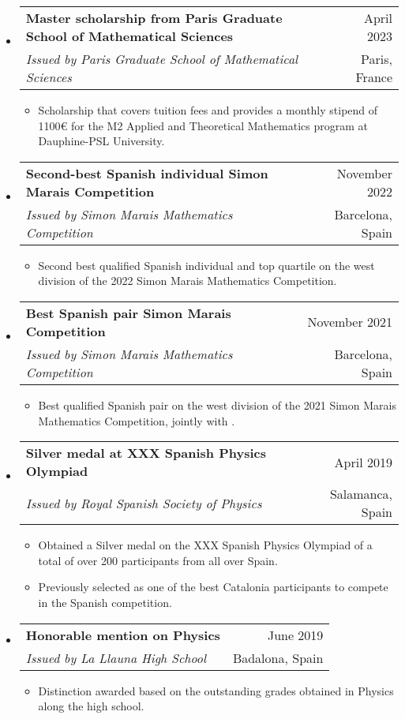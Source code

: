 \documentclass[a4paper,11pt]{article}
\makeatletter
\newcommand{\resumeQuadHeading}[4]{
  \item
  \begin{tabular*}{0.96\textwidth}[t]{l@{\extracolsep{\fill}}r}
    \textbf{#1} & \small #2 \\
    \small#3 & \small #4 \\
  \end{tabular*}
}
\newcommand{\resumeHeadingListStart}{
  \begin{itemize}[leftmargin=0.15in, label={}]
}
\newcommand{\resumeHeadingListEnd}{\end{itemize}}
\makeatother
\begin{document}
\resumeHeadingListStart{}
\resumeQuadHeading{Master scholarship from Paris Graduate School of Mathematical Sciences}{April 2023}{\textit{Issued by Paris Graduate School of Mathematical Sciences}}{Paris, France}
\begin{itemize}[leftmargin=3em, itemsep=0.1em, topsep=2pt]
  \item \small Scholarship that covers tuition fees and provides a monthly stipend of 1100€ for the M2 Applied and Theoretical Mathematics program at Dauphine-PSL University.
\end{itemize}
\resumeHeadingListEnd{}

\resumeHeadingListStart{}
\resumeQuadHeading{Second-best Spanish individual Simon Marais Competition}{November 2022}{\textit{Issued by Simon Marais Mathematics Competition}}{Barcelona, Spain}
\begin{itemize}[leftmargin=3em, itemsep=0.1em, topsep=2pt]
  \item \small Second best qualified Spanish individual and top quartile on the west division of the 2022 Simon Marais Mathematics Competition.
\end{itemize}
\resumeHeadingListEnd{}

\resumeHeadingListStart{}
\resumeQuadHeading{Best Spanish pair Simon Marais Competition}{November 2021}{\textit{Issued by Simon Marais Mathematics Competition}}{Barcelona, Spain}
\begin{itemize}[leftmargin=3em, itemsep=0.1em, topsep=2pt]
  \item \small Best qualified Spanish pair on the west division of the 2021 Simon Marais Mathematics Competition, jointly with \href{https://github.com/misaelmalqui}{}.
\end{itemize}
\resumeHeadingListEnd{}

\resumeHeadingListStart{}
\resumeQuadHeading{Silver medal at XXX Spanish Physics Olympiad}{April 2019}{\textit{Issued by Royal Spanish Society of Physics}}{Salamanca, Spain}
\begin{itemize}[leftmargin=3em, itemsep=0.1em, topsep=2pt]
  \item \small Obtained a Silver medal on the XXX Spanish Physics Olympiad of a total of over 200 participants from all over Spain.
  \item \small Previously selected as one of the best Catalonia participants to compete in the Spanish competition.
\end{itemize}
\resumeHeadingListEnd{}

\resumeHeadingListStart{}
\resumeQuadHeading{Honorable mention on Physics}{June 2019}{\textit{Issued by La Llauna High School}}{Badalona, Spain}
\begin{itemize}[leftmargin=3em, itemsep=0.1em, topsep=2pt]
  \item \small Distinction awarded based on the outstanding grades obtained in Physics along the high school.
\end{itemize}
\resumeHeadingListEnd{}
\end{document}
